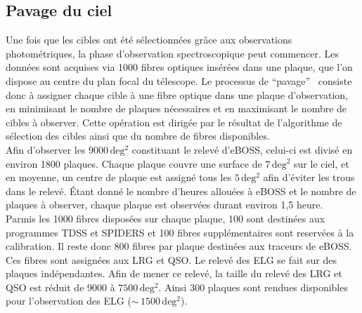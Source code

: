 \documentclass[11pt, twoside, a4paper, openright]{report}
\begin{document}
\subsection{Pavage du ciel}

Une fois que les cibles ont été sélectionnées grâce aux observations photométriques, la phase d'observation spectroscopique peut commencer. Les données sont acquises via \num{1000} fibres optiques insérées dans une plaque, que l'on dispose au centre du plan focal du télescope. 
Le processus de ``pavage''~\cite{Blanton2001} consiste donc à assigner chaque cible à une fibre optique dans une plaque d'observation, en minimisant le nombre de plaques nécessaires et en maximisant le nombre de cibles à observer. Cette opération est dirigée par le résultat de l'algorithme de sélection des cibles ainsi que du nombre de fibres disponibles. \\
Afin d'observer les $\num{9000}\,\mathrm{deg^{2}}$ constituant le relevé d'eBOSS, celui-ci est divisé en environ 1800 plaques. Chaque plaque couvre une surface de $7\,\mathrm{deg^{2}}$ sur le ciel, et en moyenne, un centre de plaque est assigné tous les $5\,\mathrm{deg^{2}}$ afin d'éviter les trous dans le relevé. Étant donné le nombre d'heures allouées à eBOSS et le nombre de plaques à observer, chaque plaque est observées durant environ 1,5 heure. \\
Parmis les \num{1000} fibres disposées sur chaque plaque, \num{100} sont destinées aux programmes TDSS et SPIDERS et \num{100} fibres supplémentaires sont reservées à la calibration. Il reste donc \num{800} fibres par plaque destinées aux traceurs de eBOSS. Ces fibres sont assignées aux LRG et QSO. Le relevé des ELG se fait sur des plaques indépendantes. Afin de mener ce relevé, la taille du relevé des LRG et QSO est réduit de \num{9000} à $\num{7500}\,\mathrm{deg^{2}}$. Ainsi \num{300} plaques sont rendues disponibles pour l'observation des ELG ($\sim\,\num{1500}\,\mathrm{deg^{2}}$).
\end{document}
